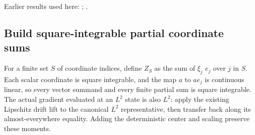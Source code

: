 \documentclass[11pt,a4paper]{report}
\begin{document}
Earlier results used here: \cite[Section~3.13]{LangevinLean2026ULASC}; \cite[Section~3.4]{LangevinLean2026ULASC}.
\subsection{\texorpdfstring{Build square-integrable partial coordinate sums}{Build square-integrable partial coordinate sums}}
\label{report-step-AverageLMC-Smoothing-lean-1}


For a finite set \(S\) of coordinate indices, define \(Z_S\) as the sum of \(\xi_j\) \(e_j\) over \(j\) in \(S\). Each scalar coordinate is square integrable, and the map \(a\) to \(ae_j\) is continuous linear, so every vector summand and every finite partial sum is square integrable. The actual gradient evaluated at an \(L^{2}\) state is also \(L^{2}\): apply the existing Lipschitz drift lift to the canonical \(L^{2}\) representative, then transfer back along its almost-everywhere equality. Adding the deterministic center and scaling preserve these moments.
\end{document}
